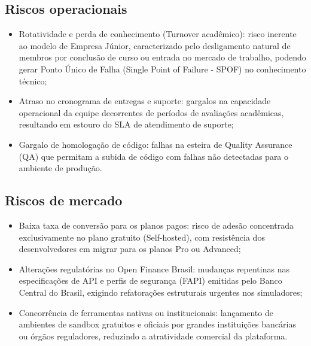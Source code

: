 \documentclass[
  12pt,
  openright,
  oneside,
  a4paper,
  brazilian
]{abntex2}
\begin{document}
\subsection{Riscos operacionais}
\label{subsec:riscos_operacionais}
\begin{itemize}
    \item{Rotatividade e perda de conhecimento (Turnover acadêmico):} risco inerente ao modelo de Empresa Júnior, caracterizado pelo desligamento natural de membros por conclusão de curso ou entrada no mercado de trabalho, podendo gerar Ponto Único de Falha (Single Point of Failure - SPOF) no conhecimento técnico;
    \item{Atraso no cronograma de entregas e suporte:} gargalos na capacidade operacional da equipe decorrentes de períodos de avaliações acadêmicas, resultando em estouro do SLA de atendimento de suporte;
    \item{Gargalo de homologação de código:} falhas na esteira de Quality Assurance (QA) que permitam a subida de código com falhas não detectadas para o ambiente de produção.
\end{itemize}

\subsection{Riscos de mercado}
\label{subsec:riscos_mercado}
\begin{itemize}
    \item{Baixa taxa de conversão para os planos pagos:} risco de adesão concentrada exclusivamente no plano gratuito (Self-hosted), com resistência dos desenvolvedores em migrar para os planos Pro ou Advanced;
    \item{Alterações regulatórias no Open Finance Brasil:} mudanças repentinas nas especificações de API e perfis de segurança (FAPI) emitidas pelo Banco Central do Brasil, exigindo refatorações estruturais urgentes nos simuladores;
    \item{Concorrência de ferramentas nativas ou institucionais:} lançamento de ambientes de sandbox gratuitos e oficiais por grandes instituições bancárias ou órgãos reguladores, reduzindo a atratividade comercial da plataforma.
\end{itemize}
\end{document}
